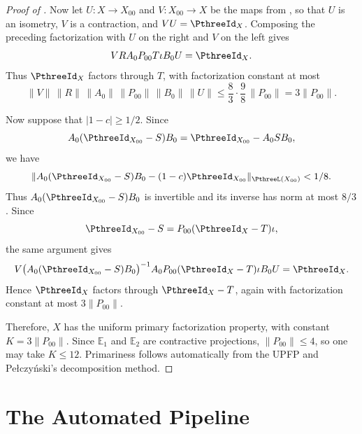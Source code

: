 \documentclass[11pt,reqno]{amsart}
\makeatletter
\theoremstyle{plain}
\theoremstyle{definition}
\newcounter{problempaper}
\newenvironment{problempaperbody}{%
  \setcounter{subsection}{0}%
  \setcounter{subsubsection}{0}%
  \setcounter{paragraph}{0}%
  \renewcommand{\thesubsection}{\arabic{subsection}}%
  \renewcommand{\thesubsubsection}{\thesubsection.\arabic{subsubsection}}%
  \renewcommand{\theparagraph}{\thesubsubsection.\arabic{paragraph}}%
  \let\problem@outersection\section
  \let\problem@outersubsection\subsection
  \let\problem@outersubsubsection\subsubsection
  \let\problem@outerparagraph\paragraph
  \let\section\problem@papersection
  \let\subsection\problem@papersubsection
  \let\subsubsection\problem@papersubsubsection
}{%
  \let\section\problem@outersection
  \let\subsection\problem@outersubsection
  \let\subsubsection\problem@outersubsubsection
  \let\paragraph\problem@outerparagraph
}
\newcommand{\problem@target}[2]{%
  \hypertarget{problem-\theproblempaper-#1-#2}{}%
}
\newcommand{\problem@paperheading}[3]{%
  \par\bigskip
  \problem@target{#1}{#2}%
  \noindent{\large\bfseries #2.\quad #3\par}%
  \nobreak\smallskip
}
\newcommand{\problem@papersubheading}[3]{%
  \par\medskip
  \problem@target{#1}{#2}%
  \noindent{\normalsize\bfseries #2.\quad #3\par}%
  \nobreak\smallskip
}
\newcommand{\problem@papersubsubheading}[3]{%
  \par\smallskip
  \problem@target{#1}{#2}%
  \noindent{\normalsize\itshape #2.\quad #3.\ }%
}
\def\problem@papersection{%
  \@ifstar{\problem@papersectionstar}{\problem@papersectionnostar}%
}
\def\problem@papersectionstar#1{%
  \par\bigskip\noindent{\large\bfseries #1\par}\nobreak\smallskip
}
\def\problem@papersectionnostar#1{%
  \refstepcounter{subsection}%
  \setcounter{subsubsection}{0}%
  \setcounter{paragraph}{0}%
  \problem@paperheading{section}{\thesubsection}{#1}%
  \problem@writecontentsline{section}{\thesubsection}{#1}%
}
\def\problem@papersubsection{%
  \@ifstar{\problem@papersubsectionstar}{\problem@papersubsectionnostar}%
}
\def\problem@papersubsectionstar#1{%
  \par\medskip\noindent{\normalsize\bfseries #1\par}\nobreak\smallskip
}
\def\problem@papersubsectionnostar#1{%
  \refstepcounter{subsubsection}%
  \setcounter{paragraph}{0}%
  \problem@papersubheading{subsection}{\thesubsubsection}{#1}%
  \problem@writecontentsline{subsection}{\thesubsubsection}{#1}%
}
\def\problem@papersubsubsection{%
  \@ifstar{\problem@papersubsubsectionstar}{\problem@papersubsubsectionnostar}%
}
\def\problem@papersubsubsectionstar#1{%
  \par\smallskip\noindent{\normalsize\itshape #1.\ }%
}
\def\problem@papersubsubsectionnostar#1{%
  \refstepcounter{paragraph}%
  \problem@papersubsubheading{subsubsection}{\theparagraph}{#1}%
  \problem@writecontentsline{subsubsection}{\theparagraph}{#1}%
}
\newcommand{\problem@writecontentsline}[3]{%
  \begingroup
  \protected@write\@auxout{}{%
    \string\problemcontentsentry{\theproblempaper}{#1}{#2}{#3}{\thepage}%
  }%
  \endgroup
}
\newcommand{\problemcontentsentry}[5]{%
  \@ifundefined{problemcontents@#1}{%
    \expandafter\gdef\csname problemcontents@#1\endcsname{}%
  }{}%
  \expandafter\g@addto@macro\csname problemcontents@#1\endcsname{%
    \problemcontentsline{#1}{#2}{#3}{#4}{#5}%
  }%
}
\newcommand{\problemcontentslink}[4]{%
  \hyperlink{problem-#1-#2-#3}{#4}%
}
\newcommand{\problemcontentsline}[5]{%
  \ifstrequal{#2}{section}{%
    \par\noindent
    \problemcontentslink{#1}{#2}{#3}{\makebox[2.5em][l]{#3}#4}%
    \nobreak\dotfill
    \problemcontentslink{#1}{#2}{#3}{#5}\par
  }{%
    \ifstrequal{#2}{subsection}{%
      \par\noindent\hspace*{1.5em}%
      \problemcontentslink{#1}{#2}{#3}{\makebox[3.5em][l]{#3}#4}%
      \nobreak\dotfill
      \problemcontentslink{#1}{#2}{#3}{#5}\par
    }{%
      \par\noindent\hspace*{3em}%
      \problemcontentslink{#1}{#2}{#3}{\makebox[4.5em][l]{#3}#4}%
      \nobreak\dotfill
      \problemcontentslink{#1}{#2}{#3}{#5}\par
    }%
  }%
}
\makeatother
\begin{document}
\begin{problempaperbody}
\begin{proof}[Proof of ]
Now let $U\colon X\to X_{00}$ and $V\colon X_{00}\to X$ be the maps from , so that $U$ is an isometry, $V$ is a contraction, and $VU=\PthreeId_X$. Composing the preceding factorization with $U$ on the right and $V$ on the left gives
\begin{equation*}
        VRA_0P_{00}T\iota B_0U=\PthreeId_X.
\end{equation*}
Thus $\PthreeId_X$ factors through $T$, with factorization constant at most
\begin{equation*}
        \|V\|\,\|R\|\,\|A_0\|\,\|P_{00}\|\,\|B_0\|\,\|U\|\leq \frac83\cdot\frac98\,\|P_{00}\|=3\|P_{00}\|.
\end{equation*}

Now suppose that $|1-c|\geq1/2$. Since
\begin{equation*}
        A_0(\PthreeId_{X_{00}}-S)B_0=\PthreeId_{X_{00}}-A_0SB_0,
\end{equation*}
we have
\begin{equation*}
        \|A_0(\PthreeId_{X_{00}}-S)B_0-(1-c)\PthreeId_{X_{00}}\|_{\PthreeL(X_{00})}<1/8.
\end{equation*}
Thus $A_0(\PthreeId_{X_{00}}-S)B_0$ is invertible and its inverse has norm at most $8/3$. Since
\begin{equation*}
        \PthreeId_{X_{00}}-S=P_{00}(\PthreeId_X-T)\iota,
\end{equation*}
the same argument gives
\begin{equation*}
        V\bigl(A_0(\PthreeId_{X_{00}}-S)B_0\bigr)^{-1}A_0P_{00}(\PthreeId_X-T)\iota B_0U=\PthreeId_X.
\end{equation*}
Hence $\PthreeId_X$ factors through $\PthreeId_X-T$, again with factorization constant at most $3\|P_{00}\|$.

Therefore, $X$ has the uniform primary factorization property, with constant $K=3\|P_{00}\|$. Since $\mathbb E_1$ and $\mathbb E_2$ are contractive projections, $\|P_{00}\|\leq4$, so one may take $K\leq12$. Primariness follows automatically from the UPFP and Pe\l czy\'nski's decomposition method.
\end{proof}


\end{problempaperbody}


\newpage
\part{The Automated Pipeline}\label{part3}
\end{document}

